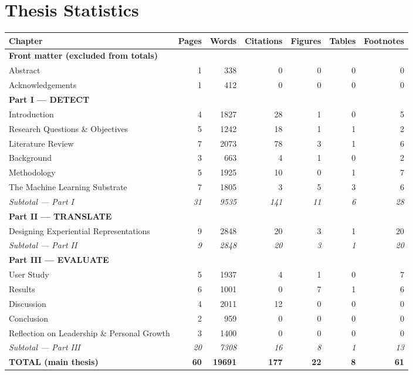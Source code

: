 \documentclass[11pt,a4paper]{article}
\begin{document}
\section*{Thesis Statistics}

\begin{tabularx}{\textwidth}{Xrrrrrr}
\toprule
Chapter & Pages & Words & Citations & Figures & Tables & Footnotes\\
\midrule
\multicolumn{7}{l}{\textbf{Front matter (excluded from totals)}} \\
\midrule
Abstract & 1 & 338 & 0 & 0 & 0 & 0 \\
Acknowledgements & 1 & 412 & 0 & 0 & 0 & 0 \\
\midrule
\multicolumn{7}{l}{\textbf{Part I --- DETECT}} \\
\midrule
Introduction & 4 & 1827 & 28 & 1 & 0 & 5 \\
Research Questions \& Objectives & 5 & 1242 & 18 & 1 & 1 & 2 \\
Literature Review & 7 & 2073 & 78 & 3 & 1 & 6 \\
Background & 3 & 663 & 4 & 1 & 0 & 2 \\
Methodology & 5 & 1925 & 10 & 0 & 1 & 7 \\
The Machine Learning Substrate & 7 & 1805 & 3 & 5 & 3 & 6 \\
\midrule
\textit{Subtotal --- Part I} & \textit{31} & \textit{9535} & \textit{141} & \textit{11} & \textit{6} & \textit{28} \\
\midrule
\multicolumn{7}{l}{\textbf{Part II --- TRANSLATE}} \\
\midrule
Designing Experiential Representations & 9 & 2848 & 20 & 3 & 1 & 20 \\
\midrule
\textit{Subtotal --- Part II} & \textit{9} & \textit{2848} & \textit{20} & \textit{3} & \textit{1} & \textit{20} \\
\midrule
\multicolumn{7}{l}{\textbf{Part III --- EVALUATE}} \\
\midrule
User Study & 5 & 1937 & 4 & 1 & 0 & 7 \\
Results & 6 & 1001 & 0 & 7 & 1 & 6 \\
Discussion & 4 & 2011 & 12 & 0 & 0 & 0 \\
Conclusion & 2 & 959 & 0 & 0 & 0 & 0 \\
Reflection on Leadership \& Personal Growth & 3 & 1400 & 0 & 0 & 0 & 0 \\
\midrule
\textit{Subtotal --- Part III} & \textit{20} & \textit{7308} & \textit{16} & \textit{8} & \textit{1} & \textit{13} \\
\midrule
\textbf{TOTAL (main thesis)} & \textbf{60} & \textbf{19691} & \textbf{177} & \textbf{22} & \textbf{8} & \textbf{61} \\
\bottomrule
\end{tabularx}
\end{document}
